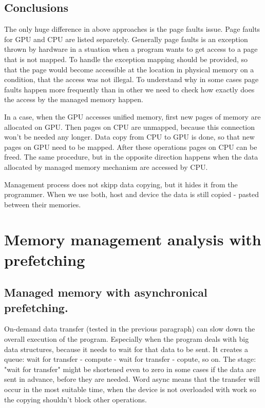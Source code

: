 \documentclass[12pt]{article}
\begin{document}
\subsection{Conclusions}
The only huge difference in above approaches is the page faults issue. Page faults for GPU and CPU are listed separetely. Generally page faults is an exception thrown by hardware in a stuation when a program wants to get access to a page that is not mapped. To handle the exception mapping should be provided, so that the page would become accessible at the location in physical memory on a condition, that the access was not illegal. To understand why in some cases page faults happen more frequently than in other we need to check how exactly does the access by the managed memory happen.

In a case, when the GPU accesses unified memory, first new pages of memory are allocated on GPU. Then pages on CPU are unmapped, because this connection won't be needed any longer. Data copy from CPU to GPU is done, so that new pages on GPU need to be mapped. After these operations pages on CPU can be freed. The same procedure, but in the opposite direction happens when the data allocated by managed memory mechanism are accessed by CPU.

Management process does not skipp data copying, but it hides it from the programmer. When we use both, host and device the data is still copied - pasted between their memories.

\section{Memory management analysis with prefetching} 

\subsection{Managed memory with asynchronical prefetching.}
On-demand data transfer (tested in the previous paragraph) can slow down the overall execution of the program. Especially when the program deals with big data structures, because it needs to wait for that data to be sent. It creates a queue: wait for transfer - compute - wait for transfer - copute, so on. The stage: "wait for transfer" might be shortened even to zero in some cases if the data are sent in advance, before they are needed. Word async means that the transfer will occur in the most suitable time, when the device is not overloaded with work so the copying shouldn't block other operations.
\end{document}
